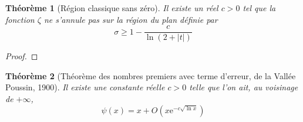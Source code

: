 \documentclass[french]{report}
\newtheorem{theorem}{Théorème}[section]
\begin{document}
\begin{theorem}[Région classique sans zéro]\label{eq:region-classique-sans-zero}
  Il existe un réel $c>0$ tel que la fonction $\zeta$ ne s'annule pas sur la région du plan définie par
  \[ \sigma\geq1-\frac{c}{\ln(2+|t|)} \]
\end{theorem}

\begin{proof}
\end{proof}

\begin{theorem}[Théorème des nombres premiers avec terme d'erreur, de la Vallée Poussin, 1900]\label{eq:tnp-vallee-poussin}
  Il existe une constante réelle $c>0$ telle que l'on ait, au voisinage de $+\infty$,
  \begin{equation}
    \psi(x)=x+O(x\mathrm{e}^{-c\sqrt{\ln x}})
  \end{equation}
\end{theorem}
\end{document}
